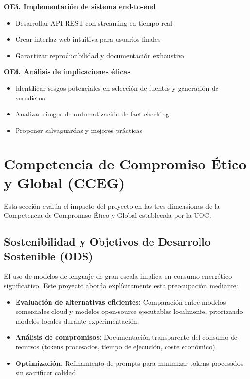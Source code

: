 \documentclass[12pt,a4paper]{article}
\begin{document}
\textbf{OE5. Implementación de sistema end-to-end}
\begin{itemize}
    \item Desarrollar API REST con streaming en tiempo real
    \item Crear interfaz web intuitiva para usuarios finales
    \item Garantizar reproducibilidad y documentación exhaustiva
\end{itemize}

\textbf{OE6. Análisis de implicaciones éticas}
\begin{itemize}
    \item Identificar sesgos potenciales en selección de fuentes y generación de veredictos
    \item Analizar riesgos de automatización de fact-checking
    \item Proponer salvaguardas y mejores prácticas
\end{itemize}

\section{Competencia de Compromiso Ético y Global (CCEG)}

Esta sección evalúa el impacto del proyecto en las tres dimensiones de la Competencia de Compromiso Ético y Global establecida por la UOC.

\subsection{Sostenibilidad y Objetivos de Desarrollo Sostenible (ODS)}

El uso de modelos de lenguaje de gran escala implica un consumo energético significativo. Este proyecto aborda explícitamente esta preocupación mediante:

\begin{itemize}
    \item \textbf{Evaluación de alternativas eficientes:} Comparación entre modelos comerciales cloud y modelos open-source ejecutables localmente, priorizando modelos locales durante experimentación.

    \item \textbf{Análisis de compromisos:} Documentación transparente del consumo de recursos (tokens procesados, tiempo de ejecución, coste económico).

    \item \textbf{Optimización:} Refinamiento de prompts para minimizar tokens procesados sin sacrificar calidad.
\end{itemize}
\end{document}

